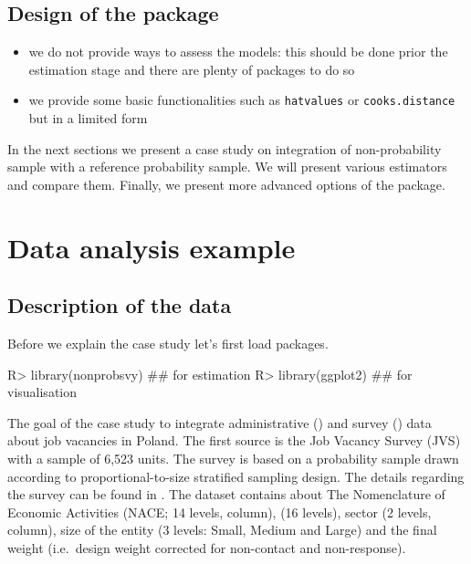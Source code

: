 \documentclass[
]{jss}
\providecommand{\tightlist}{%
  \setlength{\itemsep}{0pt}\setlength{\parskip}{0pt}}
\begin{document}
\subsection{Design of the package}\label{design-of-the-package}

\begin{itemize}
\tightlist
\item
  we do not provide ways to assess the models: this should be done prior
  the estimation stage and there are plenty of packages to do so
\item
  we provide some basic functionalities such as \texttt{hatvalues} or
  \texttt{cooks.distance} but in a limited form
\end{itemize}

In the next sections we present a case study on integration of
non-probability sample with a reference probability sample. We will
present various estimators and compare them. Finally, we present more
advanced options of the package.

\section{Data analysis example}\label{sec-data-analysis}

\subsection{Description of the data}\label{description-of-the-data}

Before we explain the case study let's first load packages.

\begin{CodeChunk}
\begin{CodeInput}
R> library(nonprobsvy) ## for estimation
R> library(ggplot2) ## for visualisation
\end{CodeInput}
\end{CodeChunk}

The goal of the case study to integrate administrative ()
and survey () data about job vacancies in Poland. The first
source is the Job Vacancy Survey (JVS) with a sample of 6,523 units. The
survey is based on a probability sample drawn according to
proportional-to-size stratified sampling design. The details regarding
the survey can be found in \cite{jvs2022}. The dataset contains about
The Nomenclature of Economic Activities (NACE; 14 levels, 
column),  (16 levels), sector (2 levels, 
column), size of the entity (3 levels: Small, Medium and Large) and the
final weight (i.e.~design weight corrected for non-contact and
non-response).
\end{document}
